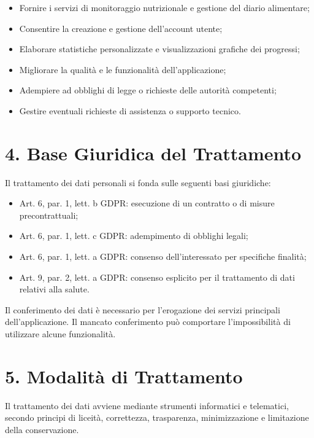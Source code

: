 \documentclass[a4paper,12pt]{article}
\begin{document}
    \begin{itemize}
        \item Fornire i servizi di monitoraggio nutrizionale e gestione del diario alimentare;
        \item Consentire la creazione e gestione dell’account utente;
        \item Elaborare statistiche personalizzate e visualizzazioni grafiche dei progressi;
        \item Migliorare la qualità e le funzionalità dell’applicazione;
        \item Adempiere ad obblighi di legge o richieste delle autorità competenti;
        \item Gestire eventuali richieste di assistenza o supporto tecnico.
    \end{itemize}

    \section*{4. Base Giuridica del Trattamento}

    Il trattamento dei dati personali si fonda sulle seguenti basi giuridiche:

    \begin{itemize}
        \item Art. 6, par. 1, lett. b GDPR: esecuzione di un contratto o di misure precontrattuali;
        \item Art. 6, par. 1, lett. c GDPR: adempimento di obblighi legali;
        \item Art. 6, par. 1, lett. a GDPR: consenso dell’interessato per specifiche finalità;
        \item Art. 9, par. 2, lett. a GDPR: consenso esplicito per il trattamento di dati relativi alla salute.
    \end{itemize}

    Il conferimento dei dati è necessario per l’erogazione dei servizi principali dell’applicazione. Il mancato conferimento può comportare l’impossibilità di utilizzare alcune funzionalità.

    \section*{5. Modalità di Trattamento}

    Il trattamento dei dati avviene mediante strumenti informatici e telematici, secondo principi di liceità, correttezza, trasparenza, minimizzazione e limitazione della conservazione.
\end{document}

